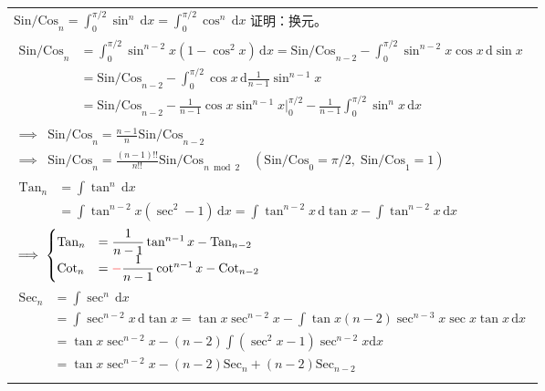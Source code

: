\documentclass[12pt, a4paper, UTF8, openany]{ctexbook}
\newcommand{\dif}{\mathrm{d}}
\newcommand{\difx}{\,\mathrm{d}x}
\begin{document}
        \begin{longtable}[h]{l}
            $\text{Sin/Cos}_n = \int_{0}^{\pi / 2} \sin^n\difx = \int_{0}^{\pi / 2} \cos^n\difx$ 证明：换元。\\

            $\begin{aligned}
                \text{Sin/Cos}_n &= \int_{0}^{\pi / 2} \sin^{n - 2}x (1 - \cos^2 x)\difx 
                = \text{Sin/Cos}_{n - 2} - \int_{0}^{\pi / 2} \sin^{n - 2}x \cos x \,\dif\sin x \\
                &= \text{Sin/Cos}_{n - 2} - \int_{0}^{\pi / 2} \cos x \,\dif \frac{1}{n - 1}\sin^{n - 1} x \\
                &= \text{Sin/Cos}_{n - 2} - \frac{1}{n - 1}\cos x \sin^{n - 1} x |_{0}^{\pi / 2} 
                    - \frac{1}{n - 1}\int_{0}^{\pi / 2} \sin^n x\difx
            \end{aligned}$ \\
            $\begin{aligned}
                \implies &\text{Sin/Cos}_n = \frac{n - 1}{n} \text{Sin/Cos}_{n - 2} \\
                \implies &\text{Sin/Cos}_n = \frac{(n - 1)!!}{n!!} \text{Sin/Cos}_{n \bmod 2} 
                \quad (\text{Sin/Cos}_0 = \pi / 2, \; \text{Sin/Cos}_1 = 1)
            \end{aligned}$ \\
            \addlinespace
            \midrule
            \addlinespace

            $\begin{aligned}
                \text{Tan}_n &= \int \tan^n\difx \\ 
                &= \int \tan^{n - 2}x (\sec^2 - 1)\difx = \int \tan^{n - 2}x\,\dif\tan x - \int\tan^{n - 2}x\difx
            \end{aligned}$ \\
            $\implies
            \begin{cases}
                \text{Tan}_n & = \dfrac{1}{n - 1}\tan^{n - 1}x - \text{Tan}_{n - 2} \\
                \text{Cot}_n & = {\color{red}-}\dfrac{1}{n - 1}\cot^{n - 1}x - \text{Cot}_{n - 2}
            \end{cases}$ \\
            \addlinespace
            \midrule
            \addlinespace

            $\begin{aligned}
                \text{Sec}_n & = \int \sec^n \difx \\
                & = \int \sec^{n - 2}x \,\dif \tan x 
                = \tan x \sec^{n - 2}x - \int \tan x (n - 2) \sec^{n - 3} x \sec x \tan x \difx \\
                & = \tan x \sec^{n - 2} x - (n - 2) \int (\sec^2 x - 1) \sec^{n - 2} x \dif x \\
                & = \tan x \sec^{n - 2} x - (n - 2)\text{Sec}_n + (n - 2)\text{Sec}_{n - 2}
            \end{aligned}$ \\
            \addlinespace


\end{longtable}
\end{document}
